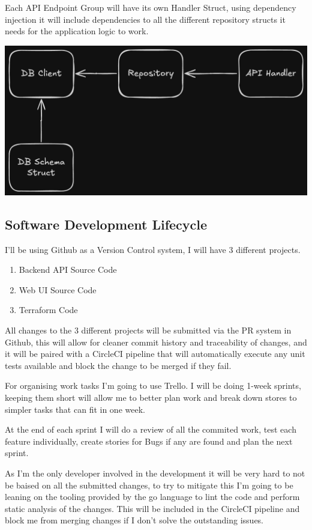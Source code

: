 \documentclass{article}
\begin{document}
  Each API Endpoint Group will have its own Handler Struct, using dependency injection it will include dependencies to all the different repository structs it needs for the application logic to work.

  \includegraphics[scale=0.30]{repository_pattern.png}

  \subsection{Software Development Lifecycle}
  I'll be using Github as a Version Control system, I will have 3 different projects.

  \begin{enumerate}
    \item Backend API Source Code
    \item Web UI Source Code
    \item Terraform Code
  \end{enumerate}

  All changes to the 3 different projects will be submitted via the PR system in Github, this will allow for cleaner commit history and traceability of changes, and it will be paired with a CircleCI pipeline that will automatically execute any unit tests available and block the change to be merged if they fail.
  
  For organising work tasks I'm going to use Trello. I will be doing 1-week sprints, keeping them short will allow me to better plan work and break down stores to simpler tasks that can fit in one week.

  At the end of each sprint I will do a review of all the commited work, test each feature individually, create stories for Bugs if any are found and plan the next sprint.

  As I'm the only developer involved in the development it will be very hard to not be baised on all the submitted changes, to try to mitigate this I'm going to be leaning on the tooling provided by the go language to lint the code and perform static analysis of the changes. This will be included in the CircleCI pipeline and block me from merging changes if I don't solve the outstanding issues.
\end{document}
